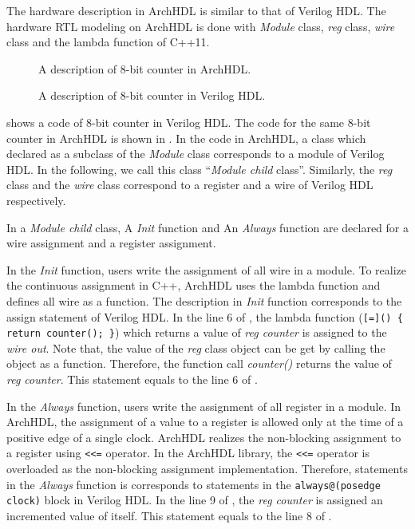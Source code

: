 The hardware description in ArchHDL is similar to that of Verilog HDL.
The hardware RTL modeling on ArchHDL is done with
\textit{Module} class, \textit{reg} class, \textit{wire} class
and the lambda function of C++11.

\begin{figure}[t]
 
 \caption{A description of 8-bit counter in ArchHDL.}
 \label{src:counter}
\end{figure}

\begin{figure}[t]
 
 \caption{A description of 8-bit counter in Verilog HDL.}
 \label{src:counter_v}
\end{figure}

 shows a code of 8-bit counter in Verilog HDL.
The code for the same 8-bit counter in ArchHDL is shown
in .
In the code in ArchHDL,
a class which declared as a subclass of the \textit{Module} class
corresponds to a module of Verilog HDL.
In the following, we call this class ``\textit{Module child} class''.
Similarly, the \textit{reg} class and the \textit{wire} class
correspond to a register and a wire of Verilog HDL respectively.

In a \textit{Module child} class, A \textit{Init} function and An \textit{Always} function are declared for a wire assignment and a register assignment.

In the \textit{Init} function, users write the assignment of all wire in a module.
To realize the continuous assignment in C++, ArchHDL uses the lambda function and defines all wire as a function.
The description in \textit{Init} function corresponds to the assign statement of Verilog HDL.
In the line 6 of , the lambda function (\texttt{[=]() \{ return counter(); \}}) which returns a value of \textit{reg counter} is assigned to the \textit{wire out}.
Note that, the value of the \textit{reg} class object can be get by calling the object as a function.
Therefore, the function call \textit{counter()} returns the value of \textit{reg counter}.
This statement equals to the line 6 of .

In the \textit{Always} function, users write the assignment of all register in a module.
In ArchHDL, the assignment of a value to a register is allowed only at the time of a positive edge of a single clock.
ArchHDL realizes the non-blocking assignment to a register using \verb`<<=` operator.
In the ArchHDL library, the \verb`<<=` operator is overloaded as the non-blocking assignment implementation.
Therefore, statements in the \textit{Always} function is corresponds to statements in the \texttt{always@(posedge clock)} block in Verilog HDL.
In the line 9 of , the \textit{reg counter} is assigned an incremented value of itself.
This statement equals to the line 8 of .


